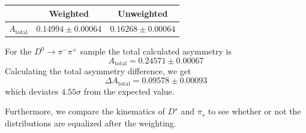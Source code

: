 \documentclass{article}
\begin{document}
    \begin{center}
        \begin{tabular}{c|c|c}
             & Weighted & Unweighted\\
             \hline\hline
            $A_{\text{total}}$ & $0.14994 \pm 0.00064$ & $0.16268 \pm 0.00064$\\
        \end{tabular}
    \end{center}

    For the $D^0\to \pi^-\pi^+$ sample the total calculated asymmetry is
    \begin{equation}
        A_{\text{total}} = 0.24571 \pm 0.00067
    \end{equation}
    Calculating the total asymmetry difference, we get
    \begin{equation}
        \Delta A_{\text{total}} = 0.09578 \pm 0.00093
    \end{equation}
    which deviates $4.55\sigma$ from the expected value.

    Furthermore, we compare the kinematics of $D^\star$ and $\pi_s$ to see whether or not the distributions are equalized after the weighting.
\end{document}
